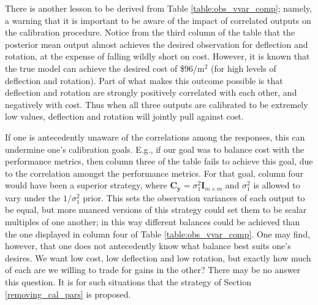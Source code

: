 \documentclass{article}
\begin{document}
There is another lesson to be derived from Table \ref{table:obs_vvar_comp}; namely, a warning that it is important to be aware of the impact of correlated outputs on the calibration procedure. Notice from the third column of the table that the posterior mean output almost achieves the desired observation for deflection and rotation, at the expense of falling wildly short on cost. However, it is known that the true model can achieve the desired cost of \$96/m$^2$ (for high levels of deflection and rotation). Part of what makes this outcome possible is that deflection and rotation are strongly positively correlated with each other, and negatively with cost. Thus when all three outputs are calibrated to be extremely low values, deflection and rotation will jointly pull against cost.

If one is antecedently unaware of the correlations among the responses, this can undermine one's calibration goals. E.g., if our goal was to balance cost with the performance metrics, then column three of the table fails to achieve this goal, due to the correlation amongst the performance metrics. For that goal, column four would have been a superior strategy, where $\mathbf C_{\mathbf y} = \sigma^2_1 \mathbf I_{m\times m}$ and $\sigma^2_1$ is allowed to vary under the $1/\sigma^2_1$ prior. This sets the observation variances of each output to be equal, but more nuanced versions of this strategy could set them to be scalar multiples of one another; in this way different balances could be achieved than the one displayed in column four of Table \ref{table:obs_vvar_comp}. One may find, however, that one does not antecedently know what balance best suits one's desires. We want low cost, low deflection and low rotation, but exactly how much of each are we willing to trade for gains in the other? There may be no answer this question. It is for such situations that the strategy of Section \ref{removing_cal_pars} is proposed.
\end{document}
